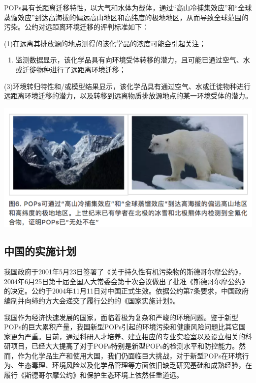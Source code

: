 \documentclass[]{book}
\providecommand{\tightlist}{%
  \setlength{\itemsep}{0pt}\setlength{\parskip}{0pt}}
\begin{document}
POPs具有长距离迁移特性，以大气和水体为载体，通过``高山冷捕集效应''和``全球蒸馏效应''到达高海拔的偏远高山地区和高纬度的极地地区，从而导致全球范围的污染。公约对远距离环境迁移的评判标准如下：

(1)在远离其排放源的地点测得的该化学品的浓度可能会引起关注；

\begin{enumerate}
\def\labelenumi{(\arabic{enumi})}
\setcounter{enumi}{1}
\tightlist
\item
  监测数据显示，该化学品具有向环境受体转移的潜力，且可能已通过空气、水或迁徙物种进行了远距离环境迁移；
\end{enumerate}

(3)环境转归特性和/或模型结果显示，该化学品具有通过空气、水或迁徙物种进行远距离环境迁移的潜力，以及转移到远离物质排放源地点的某一环境受体的潜力。

\includegraphics[width=8.33in]{images/gongyue6}

\subsection{中国的实施计划}

我国政府于2001年5月23日签署了《关于持久性有机污染物的斯德哥尔摩公约》，2004年6月25日第十届全国人大常委会第十次会议做出了批准《斯德哥尔摩公约》的决定。公约于2004年11月11日对中国正式生效。依据公约第7条要求，中国政府编制并向缔约方大会递交了履行公约的《国家实施计划》。

我国作为经济快速发展的国家，面临着极为复杂和严峻的环境问题。鉴于新型POPs的巨大累积产量，我国新型POPs引起的环境污染和健康风险问题比其它国家更为严重。目前，通过科研人才培养、建立相应的专业实验室以及设立相关的科研项目，已经大大提高了对于POPs特别是新型POPs的检测水平和防控能力。然而，作为化学品生产和使用大国，我们仍面临巨大挑战，对于新型POPs在环境行为、生态毒理、环境风险以及化学品管理等方面依旧缺乏研究基础和成熟经验，在履行《斯德哥尔摩公约》和保护生态环境上依然任重道远。
\end{document}
